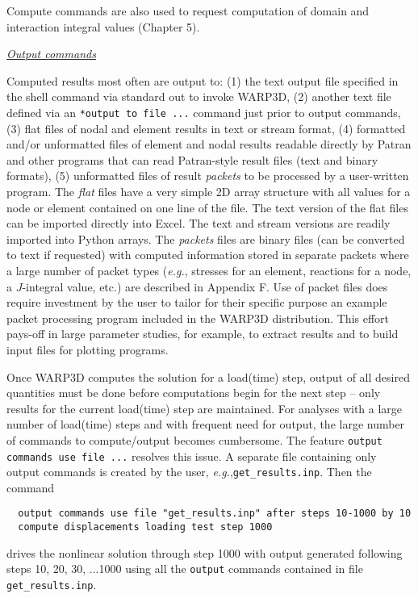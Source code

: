 \documentclass[11pt]{report}
\numberwithin{equation}{section}
\newcommand{\ttt} {\texttt}  %
\newcommand{\ul} {\underline}
\newcommand{\eg}{\emph{e.g.},\xspace}
\newcommand{\ti}{\emph}
\newcommand{\nid}{\noindent}
\begin{document}
{Compute commands are also used to request computation of domain 
and interaction  integral values (Chapter 5).

\nid \ti{\ul{Output commands} }

\nid Computed results most often are output to: (1) the text output file specified in the
shell command via standard out to invoke WARP3D, (2) another text file
defined via an \ttt{*output to file ...} command just prior to output commands, (3) flat files of nodal 
and element results in text or stream format, (4) formatted and/or unformatted files of
element and nodal results readable directly by Patran and other programs
that can read Patran-style result files (text and binary formats), (5) unformatted files of result
\ti{packets} to be processed by a user-written program. The \ti{flat} files have a very simple 2D array structure
with all values for a node or element contained on one line of the file. The text version of the
flat files can be imported directly into Excel. The text and stream versions are readily imported
into Python arrays. The \ti{packets} files are binary files (can be converted to text if requested)
with computed information stored in separate packets where a large number of packet types (\eg stresses for
an element, reactions for a node, a $J$-integral value, etc.)
are described in Appendix F.  Use of packet files does require investment by the user to tailor for their specific
purpose an example packet processing program included in the WARP3D distribution. This effort pays-off
in large parameter studies, for example, to extract results and to build input files for plotting programs.

Once WARP3D computes the solution for a load(time) step, output of all desired quantities
must be done before computations begin for the next step -- only results for the current load(time) step are
maintained. For analyses with a large number of load(time) steps and with frequent 
need for output, the large number of commands to compute/output becomes cumbersome. 
The feature \ttt{output commands
use file ...} resolves this issue. A separate file containing only output commands is created 
by the user, \eg \ttt{get\_results.inp}. Then the command
%

\small\begin{verbatim}
  output commands use file "get_results.inp" after steps 10-1000 by 10
  compute displacements loading test step 1000
\end{verbatim}  \normalsize
%
\nid drives the nonlinear solution through step 1000 with output generated following
steps 10, 20, 30, ...1000 using all the \ttt{output} commands contained in file
\ttt{get\_results.inp}.

}
\end{document}
